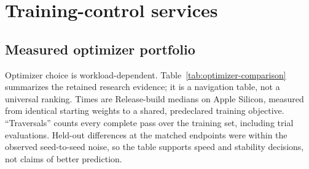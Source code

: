\section{Training-control services}\label{training_control_objects}

\subsection{Measured optimizer portfolio}\label{optimizer_comparison}

Optimizer choice is workload-dependent.  Table~\ref{tab:optimizer-comparison}
summarizes the retained research evidence; it is a navigation table, not a
universal ranking.  Times are Release-build medians on Apple Silicon, measured
from identical starting weights to a shared, predeclared training objective.
``Traversals'' counts every complete pass over the training set, including trial
evaluations.  Held-out differences at the matched endpoints were within the
observed seed-to-seed noise, so the table supports speed and stability decisions,
not claims of better prediction.


